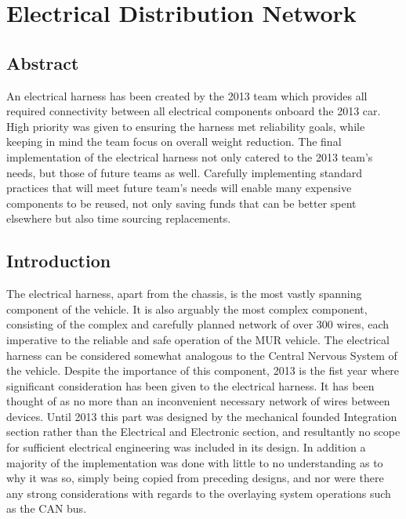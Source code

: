 \graphicspath{ {./Images/Electrical_Harness/} }

\chapter{Electrical Distribution Network}

\section{Abstract} 

An electrical harness has been created by the 2013 team which provides all required connectivity between all electrical components onboard the 2013 car. High priority was given to ensuring the harness met reliability goals, while keeping in mind the team focus on overall weight reduction. The final implementation of the electrical harness not only catered to the 2013 team's needs, but those of future teams as well. Carefully implementing standard practices that will meet future team's needs will enable many expensive components to be reused, not only saving funds that can be better spent elsewhere but also time sourcing replacements.

\section{Introduction}

The electrical harness, apart from the chassis, is the most vastly spanning component of the vehicle. It is also arguably the most complex component, consisting of the complex and carefully planned network of over 300 wires, each imperative to the reliable and safe operation of the MUR vehicle. The electrical harness can be considered somewhat analogous to the Central Nervous System of the vehicle. Despite the importance of this component, 2013 is the fist year where significant consideration has been given to the electrical harness. It has been thought of as no more than an inconvenient necessary network of wires between devices. Until 2013 this part was designed by the mechanical founded Integration section rather than the Electrical and Electronic section, and resultantly no scope for sufficient electrical engineering was included in its design.  In addition a majority of the implementation was done with little to no understanding as to why it was so, simply being copied from preceding designs, and nor were there any strong considerations with regards to the overlaying system operations such as the CAN bus.


